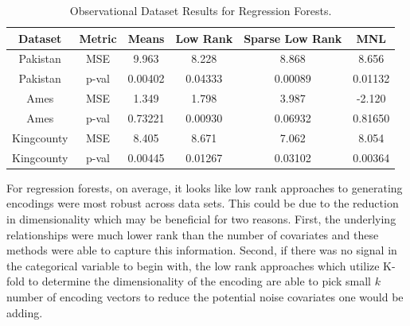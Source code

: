 \documentclass{article}
\theoremstyle{plain}
\theoremstyle{definition}
\theoremstyle{remark}
\begin{document}
\begin{table}[H]
	\centering
	\begin{tabular}{|c|c|c|c|c|c|}
		\hline
		Dataset& Metric & Means & Low Rank & Sparse Low Rank & MNL  \\
		\hline
		Pakistan & MSE & 9.963 &8.228 &8.868 &8.656 \\
		Pakistan & p-val& 0.00402 & 0.04333&0.00089 &0.01132 \\
		\hline
		Ames & MSE & 1.349 & 1.798&3.987 &-2.120\\
		Ames & p-val&0.73221&0.00930&0.06932&0.81650 \\
		\hline
		Kingcounty & MSE &8.405&8.671&7.062& 8.054\\
		Kingcounty & p-val&0.00445&0.01267&0.03102&0.00364 \\
		\hline
	\end{tabular}
	\caption{Observational Dataset Results for Regression Forests.}
	\label{tab:observational_rf}
\end{table}
For regression forests, on average, it looks like low rank approaches to generating encodings were most robust across data sets. This could be due to the reduction in dimensionality which may be beneficial  for two reasons. First, the underlying relationships were much lower rank than the number of covariates and these methods were able to capture this information. Second, if there was no signal in the categorical variable to begin with, the low rank approaches which utilize K-fold to determine the dimensionality of the encoding are able to pick small $k$ number of encoding vectors to reduce the potential noise covariates one would be adding.

\end{document}
